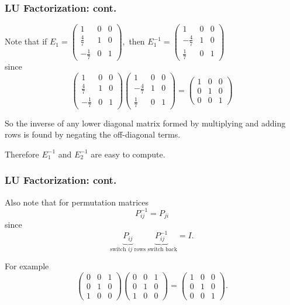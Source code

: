 \documentclass{beamer}
\begin{document}
\begin{frame}\frametitle{LU Factorization: cont.}
	Note that if 
 	\(
	E_1 = \begin{pmatrix}
    	1 & 0 & 0\\
    	\frac{4}{7} & 1 & 0\\
    	-\frac{1}{7} & 0 & 1
  		\end{pmatrix},
  	\)
  	then
	\(
	E_1^{-1} = \begin{pmatrix}
    	1 & 0 & 0\\
    	-\frac{4}{7} & 1 & 0\\
    	\frac{1}{7} & 0 & 1
    	\end{pmatrix}
	\) \\
	since 
	\[ 
	\begin{pmatrix}
    	1 & 0 & 0\\
    	\frac{4}{7} & 1 & 0\\
    	-\frac{1}{7} & 0 & 1
    \end{pmatrix}
    \begin{pmatrix}
    	1 & 0 & 0\\
    	-\frac{4}{7} & 1 & 0\\
    	\frac{1}{7} & 0 & 1
    \end{pmatrix}
    =\begin{pmatrix}
    	1 & 0 & 0\\
    	0 & 1 & 0\\
    	0 & 0 & 1
    \end{pmatrix}
	\]
	
	\vfill
	
	So the inverse of any lower diagonal matrix formed by multiplying and adding rows is found by negating the off-diagonal terms.
	
	\vfill

	Therefore $E_1^{-1}$ and $E_2^{-1}$ are easy to compute.
\end{frame}
	
\begin{frame}\frametitle{LU Factorization: cont.}
	Also note that for permutation matrices 
	\[
	P_{ij}^{-1} = P_{ji}
	\]
	since 
	\[
	\underbrace{P_{ij}}_{\text{switch $ij$ rows}}
	\underbrace{P_{ij}^{-1}}_{\text{ switch back}} = I.
	\]

	For example
	\[
	\begin{pmatrix}
    	0 & 0 & 1\\
    	0 & 1 & 0\\
    	1 & 0 & 0
	\end{pmatrix}
	\begin{pmatrix}
    	0 & 0 & 1\\
    	0 & 1 & 0\\
    	1 & 0 & 0
	\end{pmatrix}
	=
	\begin{pmatrix}
    	1 & 0 & 0\\
    	0 & 1 & 0\\
    	0 & 0 & 1
	\end{pmatrix}.
	\]
\end{frame}
\end{document}
